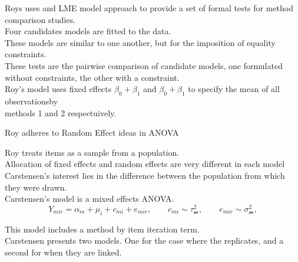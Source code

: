 \documentclass[12pt, a4paper]{article}
\theoremstyle{plain}
\theoremstyle{definition}
\theoremstyle{remark}
\begin{document}




Roys uses and LME model approach to provide a set of formal tests for method comparison studies.\\

Four candidates models are fitted to the data.\\

These models are similar to one another, but for the imposition of equality constraints.\\

These tests are the pairwise comparison of candidate models, one formulated without constraints, the other with a constraint.\\


Roy's model uses fixed effects $\beta_0 + \beta_1$ and $\beta_0 + \beta_1$ to specify the mean of all observationsby \\ methods 1 and 2 respectuively.





Roy adheres to Random Effect ideas in ANOVA

Roy treats items as a sample from a population.\\

Allocation of fixed effects and random effects are very different in each model\\

Carstensen's interest lies in the difference between the population from which they were drawn.\\

Carstensen's model is a mixed effects ANOVA.\\

\[
Y_{mir}  =  \alpha_m + \mu_i + c_{mi} + e_{mir}, \qquad c_{mi} \sim \mathcal{\tau^2_m}, \qquad e_{mir} \sim \mathcal{\sigma^2_m},
\]

This model includes a method by item iteration term.\\

Carstensen presents two models. One for the case where the replicates, and a second for when they are linked.\\
\end{document}
